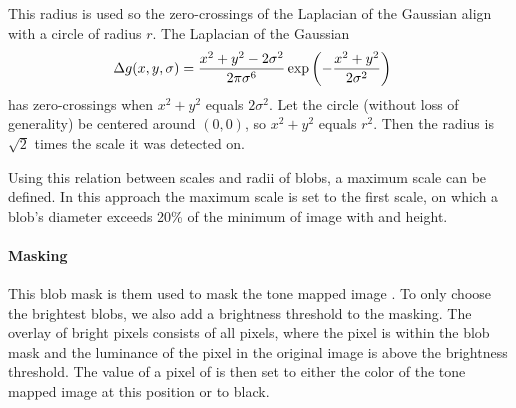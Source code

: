 This radius is used so the zero\hyp{}crossings of the Laplacian of the Gaussian align with a circle of radius $r$.
The Laplacian of the Gaussian 
\begin{align}
	\Delta g(x, y, \sigma) &= \frac{x^2 + y^2 -2\sigma^2}{2 \pi \sigma^6} \exp\left(- \frac{x^2 + y^2}{2 \sigma^2} \right)
\end{align} 
has zero\hyp{}crossings when $x^2 + y^2$ equals $2\sigma^2$.
Let the circle (without loss of generality) be centered around $(0, 0)$, so $x^2 + y^2$ equals $r^2$.
Then the radius is $\sqrt{2}$ times the scale it was detected on.

Using this relation between scales and radii of blobs, a maximum scale can be defined.
In this approach the maximum scale is set to the first scale, on which a blob's diameter exceeds 20\% of the minimum of image with and height.


\paragraph{Masking}
This blob mask is them used to mask the tone mapped image \tonemappedimage{}.
To only choose the brightest blobs, we also add a brightness threshold to the masking.
The overlay of bright pixels \overlay{} consists of all pixels, where the pixel is within the blob mask and the luminance of the pixel in the original image is above the brightness threshold.
The value of a pixel of \overlay{} is then set to either the color of the tone mapped image at this position or to black.

